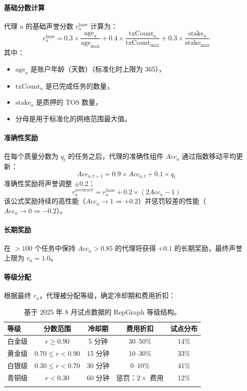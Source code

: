 \documentclass[11pt]{article}
\begin{document}
\paragraph{基础分数计算} 代理 $a$ 的基础声誉分数 $r_a^{\text{base}}$ 计算为：
\begin{equation}
r_a^{\text{base}} = 0.3 \times \frac{\text{age}_a}{\text{age}_{\max}} + 0.4 \times \frac{\text{txCount}_a}{\text{txCount}_{\max}} + 0.3 \times \frac{\text{stake}_a}{\text{stake}_{\max}}
\end{equation}
其中：
\begin{itemize}[noitemsep]
  \item $\text{age}_a$ 是账户年龄（天数）（标准化时上限为 365），
  \item $\text{txCount}_a$ 是已完成任务的数量，
  \item $\text{stake}_a$ 是质押的 TOS 数量，
  \item 分母是用于标准化的网络范围最大值。
\end{itemize}

\paragraph{准确性奖励} 在每个质量分数为 $q_t$ 的任务之后，代理的准确性组件 $Acc_a$ 通过指数移动平均更新：
\begin{equation}
Acc_{a,t+1} = 0.9 \times Acc_{a,t} + 0.1 \times q_t
\end{equation}
准确性奖励将声誉调整 $\pm 0.2$：
\begin{equation}
r_a^{\text{accuracy}} = r_a^{\text{base}} + 0.2 \times (2 Acc_a - 1)
\end{equation}
该公式奖励持续的高性能（$Acc_a \to 1 \Rightarrow +0.2$）并惩罚较差的性能（$Acc_a \to 0 \Rightarrow -0.2$）。

\paragraph{长期奖励} 在 $>100$ 个任务中保持 $Acc_a > 0.85$ 的代理将获得 $+0.1$ 的长期奖励，最终声誉上限为 $r_a = 1.0$。

\paragraph{等级分配} 根据最终 $r_a$，代理被分配等级，确定冷却期和费用折扣：
\begin{longtable}{@{}lcccc@{}}
\toprule
\textbf{等级} & \textbf{分数范围} & \textbf{冷却期} & \textbf{费用折扣} & \textbf{试点分布} \\\midrule
白金级 & $r \geq 0.90$ & 5 分钟 & 30--50\% & 14\% \\
黄金级 & $0.70 \leq r < 0.90$ & 15 分钟 & 10--30\% & 33\% \\
白银级 & $0.30 \leq r < 0.70$ & 30 分钟 & 0--10\% & 41\% \\
青铜级 & $r < 0.30$ & 60 分钟 & 惩罚：$2 \times$ 费用 & 12\% \\\bottomrule
\caption{基于 2025 年 8 月试点数据的 RepGraph 等级结构。}
\label{tab:reputation-tiers}
\end{longtable}
\end{document}
